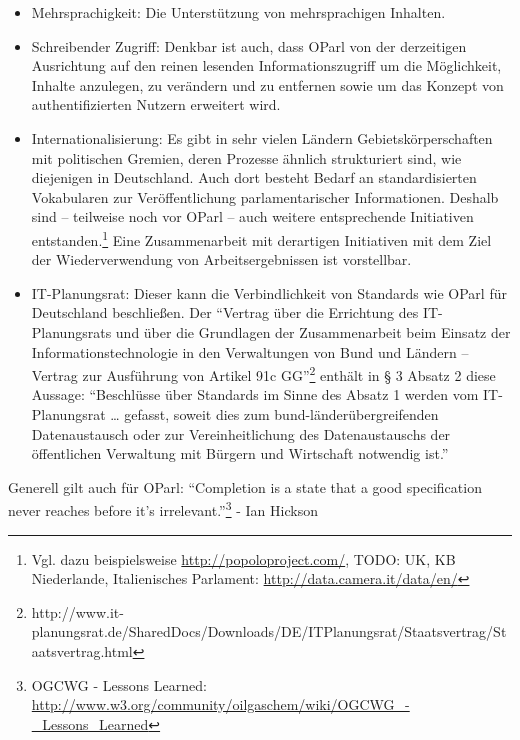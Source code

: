 \documentclass[,a4paper]{article}
\begin{document}
\begin{itemize}
  Standards verwenden. Deshalb werden entsprechende
  Standardisierungsvorhaben wie Linked Data Platform Paging\footnote{https://dvcs.w3.org/hg/ldpwg/raw-file/default/ldp-paging.html}
  des W3C und das Hydra Core Vocabulary\footnote{http://hydra-cg.com/spec/latest/core/\#collections}
  beobachtet.
\item
  Mehrsprachigkeit: Die Unterstützung von mehrsprachigen Inhalten.
\item
  Schreibender Zugriff: Denkbar ist auch, dass OParl von der derzeitigen
  Ausrichtung auf den reinen lesenden Informationszugriff um die
  Möglichkeit, Inhalte anzulegen, zu verändern und zu entfernen sowie um
  das Konzept von authentifizierten Nutzern erweitert wird.
\item
  Internationalisierung: Es gibt in sehr vielen Ländern
  Gebietskörperschaften mit politischen Gremien, deren Prozesse ähnlich
  strukturiert sind, wie diejenigen in Deutschland. Auch dort besteht
  Bedarf an standardisierten Vokabularen zur Veröffentlichung
  parlamentarischer Informationen. Deshalb sind -- teilweise noch vor
  OParl -- auch weitere entsprechende Initiativen entstanden.\footnote{Vgl.
    dazu beispielsweise \url{http://popoloproject.com/}, TODO: UK, KB
    Niederlande, Italienisches Parlament:
    \url{http://data.camera.it/data/en/}} Eine Zusammenarbeit mit
  derartigen Initiativen mit dem Ziel der Wiederverwendung von
  Arbeitsergebnissen ist vorstellbar.
\item
  IT-Planungsrat: Dieser kann die Verbindlichkeit von Standards wie
  OParl für Deutschland beschließen. Der ``Vertrag über die Errichtung
  des IT-Planungsrats und über die Grundlagen der Zusammenarbeit beim
  Einsatz der Informationstechnologie in den Verwaltungen von Bund und
  Ländern -- Vertrag zur Ausführung von Artikel 91c GG''\footnote{http://www.it-planungsrat.de/SharedDocs/Downloads/DE/ITPlanungsrat/Staatsvertrag/Staatsvertrag.html}
  enthält in § 3 Absatz 2 diese Aussage: ``Beschlüsse über Standards im
  Sinne des Absatz 1 werden vom IT-Planungsrat \ldots{} gefasst, soweit
  dies zum bund-länderübergreifenden Datenaustausch oder zur
  Vereinheitlichung des Datenaustauschs der öffentlichen Verwaltung mit
  Bürgern und Wirtschaft notwendig ist.''
\end{itemize}

Generell gilt auch für OParl: ``Completion is a state that a good
specification never reaches before it's irrelevant.''\footnote{OGCWG -
  Lessons Learned:
  \url{http://www.w3.org/community/oilgaschem/wiki/OGCWG_-_Lessons_Learned}}
- Ian Hickson
\end{document}
